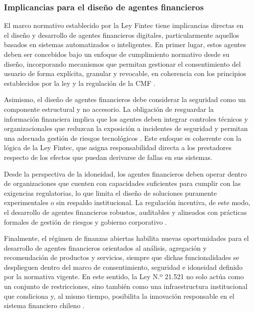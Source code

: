 \documentclass[
	spanish, %
	letterpaper, oneside
]{book}
\begin{document}
\subsubsection{Implicancias para el diseño de agentes financieros}

El marco normativo establecido por la Ley Fintec tiene implicancias directas en el diseño y desarrollo de agentes financieros digitales, particularmente aquellos basados en sistemas automatizados o inteligentes. En primer lugar, estos agentes deben ser concebidos bajo un enfoque de cumplimiento normativo desde su diseño, incorporando mecanismos que permitan gestionar el consentimiento del usuario de forma explícita, granular y revocable, en coherencia con los principios establecidos por la ley y la regulación de la CMF \cite{ley21521,cmf_fintech}.

Asimismo, el diseño de agentes financieros debe considerar la seguridad como un componente estructural y no accesorio. La obligación de resguardar la información financiera implica que los agentes deben integrar controles técnicos y organizacionales que reduzcan la exposición a incidentes de seguridad y permitan una adecuada gestión de riesgos tecnológicos \cite{cmf_fintech}. Este enfoque es coherente con la lógica de la Ley Fintec, que asigna responsabilidad directa a los prestadores respecto de los efectos que puedan derivarse de fallas en sus sistemas.

Desde la perspectiva de la idoneidad, los agentes financieros deben operar dentro de organizaciones que cuenten con capacidades suficientes para cumplir con las exigencias regulatorias, lo que limita el diseño de soluciones puramente experimentales o sin respaldo institucional. La regulación incentiva, de este modo, el desarrollo de agentes financieros robustos, auditables y alineados con prácticas formales de gestión de riesgos y gobierno corporativo \cite{ley21521}.

Finalmente, el régimen de finanzas abiertas habilita nuevas oportunidades para el desarrollo de agentes financieros orientados al análisis, agregación y recomendación de productos y servicios, siempre que dichas funcionalidades se desplieguen dentro del marco de consentimiento, seguridad e idoneidad definido por la normativa vigente. En este sentido, la Ley N.º 21.521 no solo actúa como un conjunto de restricciones, sino también como una infraestructura institucional que condiciona y, al mismo tiempo, posibilita la innovación responsable en el sistema financiero chileno \cite{cmf_fintech}.
\end{document}
